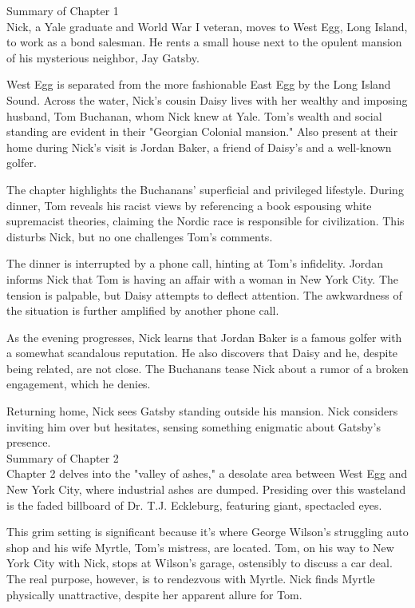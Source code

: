 \begin{tcolorbox}[title = {History}, breakable]
Summary of Chapter 1 \\
Nick, a Yale graduate and World War I veteran, moves to West Egg, Long Island, to work as a bond salesman.  He rents a small house next to the opulent mansion of his mysterious neighbor, Jay Gatsby.

West Egg is separated from the more fashionable East Egg by the Long Island Sound.  Across the water, Nick's cousin Daisy lives with her wealthy and imposing husband, Tom Buchanan, whom Nick knew at Yale.  Tom's wealth and social standing are evident in their "Georgian Colonial mansion."  Also present at their home during Nick's visit is Jordan Baker, a friend of Daisy's and a well-known golfer.

The chapter highlights the Buchanans' superficial and privileged lifestyle.  During dinner, Tom reveals his racist views by referencing a book espousing white supremacist theories, claiming the Nordic race is responsible for civilization.  This disturbs Nick, but no one challenges Tom's comments.

The dinner is interrupted by a phone call, hinting at Tom's infidelity.  Jordan informs Nick that Tom is having an affair with a woman in New York City.  The tension is palpable, but Daisy attempts to deflect attention.  The awkwardness of the situation is further amplified by another phone call.

As the evening progresses, Nick learns that Jordan Baker is a famous golfer with a somewhat scandalous reputation.  He also discovers that Daisy and he, despite being related, are not close.  The Buchanans tease Nick about a rumor of a broken engagement, which he denies.

Returning home, Nick sees Gatsby standing outside his mansion.  Nick considers inviting him over but hesitates, sensing something enigmatic about Gatsby's presence.
\\Summary of Chapter 2 \\
Chapter 2 delves into the "valley of ashes," a desolate area between West Egg and New York City, where industrial ashes are dumped.  Presiding over this wasteland is the faded billboard of Dr. T.J. Eckleburg, featuring giant, spectacled eyes.

This grim setting is significant because it's where George Wilson's struggling auto shop and his wife Myrtle, Tom's mistress, are located.  Tom, on his way to New York City with Nick, stops at Wilson's garage, ostensibly to discuss a car deal.  The real purpose, however, is to rendezvous with Myrtle. Nick finds Myrtle physically unattractive, despite her apparent allure for Tom.


\end{tcolorbox}

